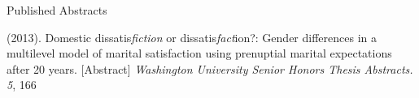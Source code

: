 \begin{rSection}{\textrm{Published Abstracts}}\begin{etaremune}
\item\meb (2013). Domestic dissatis{\em fiction} or dissatis{\em fact}ion?: Gender differences in a multilevel model of marital satisfaction using prenuptial marital expectations after 20 years. [Abstract] {\em Washington University Senior Honors Thesis Abstracts. 5}, 166
\end{etaremune}\end{rSection}